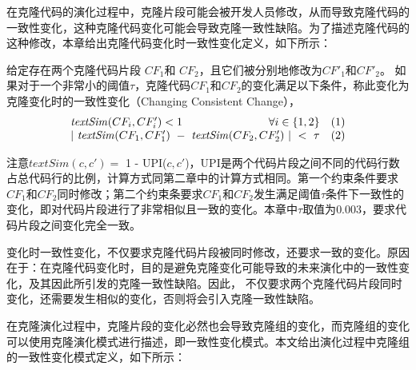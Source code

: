 在克隆代码的演化过程中，克隆片段可能会被开发人员修改，从而导致克隆代码的一致性变化，这种克隆代码变化可能会导致克隆一致性缺陷。为了描述克隆代码的这种修改，本章给出克隆代码变化时一致性变化定义，如下所示：\\

\begin{definition}
[变化时一致性变化]  
\label{def-changingchange}
给定存在两个克隆代码片段 $CF_1$和 $CF_2$，且它们被分别地修改为$CF'_1$和$CF'_2$。  如果对于一个非常小的阈值$\tau$，克隆代码$CF_1$和$CF_2$的变化满足以下条件，称此变化为克隆变化时的一致性变化（Changing Consistent Change）， 
  \[
  \begin{array}[t]{crl}
    \mathit{textSim}(CF_i, CF'_i) < 1 & \forall i \in \{1,2\} &(1) \\
    \multicolumn{2}{c}{| ~\mathit{textSim}(CF_1,CF'_1)  ~-~ \mathit{textSim}(CF_2,CF'_2) ~| ~< ~ \tau}  & (2)
  \end{array}
  \]
\end{definition}

  
注意$\mathit {textSim}(c,c')= $ 1 - UPI($ c,c'$)，UPI是两个代码片段之间不同的代码行数占总代码行的比例，计算方式同第二章中的计算方式相同。第一个约束条件要求 $ CF_1 $和$CF_2 $同时修改；第二个约束条要求$ CF_1 $和$CF_2$发生满足阈值$\tau$条件下一致性的变化，即对代码片段进行了非常相似且一致的变化。本章中$\tau$取值为$0.003$，要求代码片段之间变化完全一致。

变化时一致性变化，不仅要求克隆代码片段被同时修改，还要求一致的变化。原因在于：在克隆代码变化时，目的是避免克隆变化可能导致的未来演化中的一致性变化，及其因此所引发的克隆一致性缺陷。因此， 不仅要求两个克隆代码片段同时变化，还需要发生相似的变化，否则将会引入克隆一致性缺陷。

在克隆演化过程中，克隆片段的变化必然也会导致克隆组的变化，而克隆组的变化可以使用克隆演化模式进行描述，即一致性变化模式。本文给出演化过程中克隆组的一致性变化模式定义，如下所示：\\

